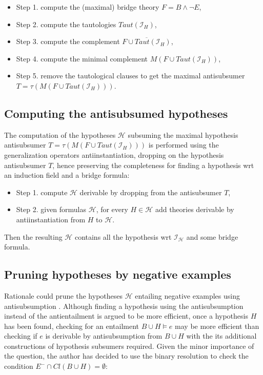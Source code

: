 \begin{itemize}
\item Step 1. compute the (maximal) bridge theory $F=B \land \neg E$,
\item Step 2. compute the tautologies $Taut(\mathcal{I}_H)$,
\item Step 3. compute the complement $\overline{F \cup Taut(\mathcal{I}_H)}$,
\item Step 4. compute the minimal complement $M(F \cup Taut(\mathcal{I}_H))$,
\item Step 5. remove the tautological clauses to get the maximal antisubsumer $T=\tau(M(F \cup Taut(\mathcal{I}_H)))$.
\end{itemize}

\subsection{Computing the antisubsumed hypotheses}
The computation of the hypotheses $\mathcal{H}$ subsuming the maximal hypothesis  antisubsumer $T=\tau(M(F \cup Taut(\mathcal{I}_H)))$ is performed using the generalization operators\cite{yamamoto2008towards} antiinstantiation, dropping on the hypothesis antisubsumer $T$, hence preserving the completeness for finding a hypothesis wrt an induction field and a bridge formula:

\begin{itemize}
\item Step 1. compute $\mathcal{H}$ derivable by dropping from the antisubsumer $T$,
\item Step 2. given formulas $\mathcal{H}$, for every $H \in \mathcal{H}$ add theories derivable by antiinstantiation from $H$ to $\mathcal{H}$.
\end{itemize}

Then the resulting $\mathcal{H}$ contains all the hypothesis wrt $\mathcal{I_H}$ and some bridge formula.

\subsection{Pruning hypotheses by negative examples}
Rationale could prune the hypotheses $\mathcal{H}$ entailing negative examples using antisubsumption .
Although finding a hypothesis using the antisubsumption instead of the antientailment is argued to be more efficient\cite{yamamoto2012inverse}, once a hypothesis $H$ has been found, checking for an entailment $B \cup H \models e$ may be more efficient than checking if $e$ is derivable by antisubsumption from $B \cup H$ with the its additional constructions of hypothesis subsumers required. Given the minor importance of the question, the author has decided to use the binary resolution to check the condition $E^- \cap Cl(B \cup H)=\emptyset$:

